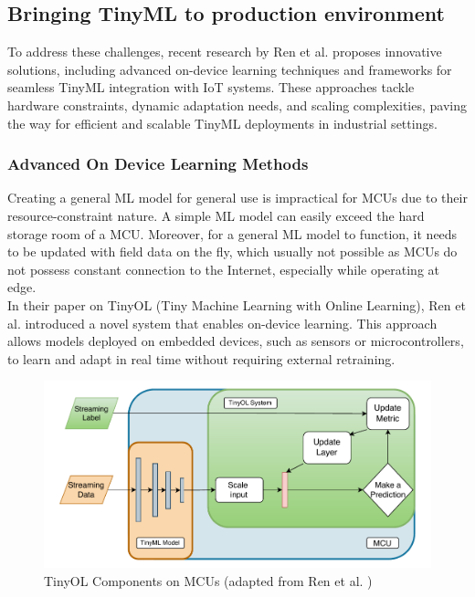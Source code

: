 \documentclass[twocolumn]{article}
\begin{document}
\subsection{Bringing TinyML to production environment}

To address these challenges, recent research by Ren et al. \cite{ren_tinyol_2021, ren_how_2022, ren_device_2024} proposes innovative solutions, including advanced on-device learning techniques and frameworks for seamless TinyML integration with IoT systems. These approaches tackle hardware constraints, dynamic adaptation needs, and scaling complexities, paving the way for efficient and scalable TinyML deployments in industrial settings.

\subsubsection{Advanced On Device Learning Methods}
Creating a general ML model for general use is impractical for MCUs due to their resource-constraint nature. A simple ML model can easily exceed the hard storage room of a MCU. Moreover, for a general ML model to function, it needs to be updated with field data on the fly, which usually not possible as MCUs do not possess constant connection to the Internet, especially while operating at edge.\\[0.1cm]

In their paper on TinyOL (Tiny Machine Learning with Online Learning), Ren et al. introduced a novel system that enables on-device learning. This approach allows models deployed on embedded devices, such as sensors or microcontrollers, to learn and adapt in real time without requiring external retraining.

\begin{figure}
	\centerline{
	\includegraphics[width=1\columnwidth,height=0.2\textheight]{resource/tinyol_on_mcu.pdf}
	}
	\caption{TinyOL Components on MCUs (adapted from Ren et al. \cite{ren_tinyol_2021})}
	\label{TinyOL}
\end{figure}
\end{document}
